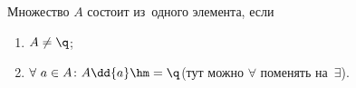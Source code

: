 
    Множество $A$ состоит из~одного элемента, если

    \begin{enumerate}
        \item $A\neq\q$;
        \item $\forall\  a\in A\colon A\dd \{a\}\hm=\q$\pau (тут можно $\forall$ поменять на~$\exists$).
    \end{enumerate}
